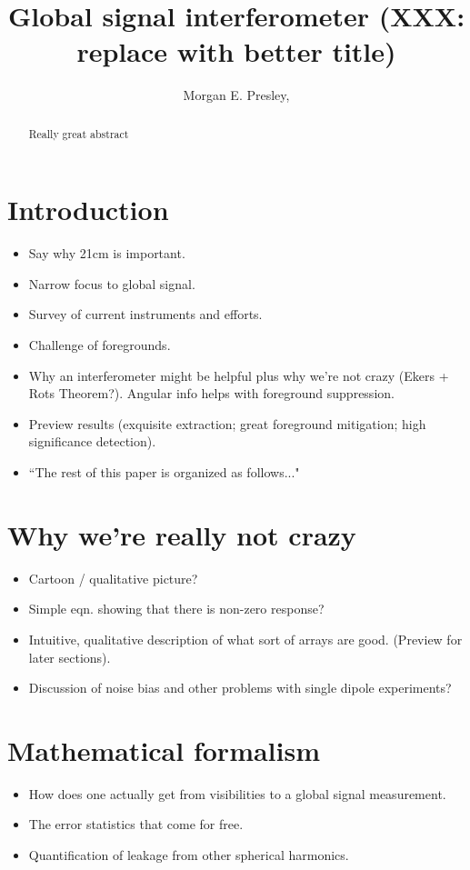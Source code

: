 \documentclass[twolcolumn,apj]{emulateapj}
\begin{document}
\title{Global signal interferometer (XXX: replace with better title)}

\author{Morgan E. Presley,
}

\begin{abstract}
Really great abstract
\end{abstract}



\section{Introduction}
\begin{itemize}
\item Say why 21cm is important.
\item Narrow focus to global signal.
\item Survey of current instruments and efforts.
\item Challenge of foregrounds.
\item Why an interferometer might be helpful plus why we're not crazy (Ekers + Rots Theorem?).  Angular info helps with foreground suppression.
\item Preview results (exquisite extraction; great foreground mitigation; high significance detection).
\item ``The rest of this paper is organized as follows..."
\end{itemize}

\section{Why we're really not crazy}
\begin{itemize}
\item Cartoon / qualitative picture?
\item Simple eqn. showing that there is non-zero response?
\item Intuitive, qualitative description of what sort of arrays are good.  (Preview for later sections).
\item Discussion of noise bias and other problems with single dipole experiments?
\end{itemize}

\section{Mathematical formalism}
\begin{itemize}
\item How does one actually get from visibilities to a global signal measurement.
\item The error statistics that come for free.
\item Quantification of leakage from other spherical harmonics.
\end{itemize}
\end{document}
